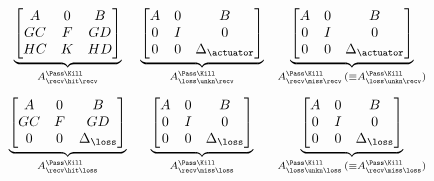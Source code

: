 \begin{equation}
    \label{eq:pass-kill} 
    \begin{matrix}
        \underbrace{\begin{bmatrix}
            A  & 0  & B \\
            GC & F & GD \\
            HC & K & HD \\
        \end{bmatrix}}_{A_{\recv\hit\recv}^{\Pass\Kill}} & 
        \underbrace{\begin{bmatrix}
            A & 0 & B \\
            0 & I & 0 \\
            0 & 0 & \Delta_\actuator \\
        \end{bmatrix}}_{A_{\loss\unkn\recv}^{\Pass\Kill}} &
        \underbrace{\begin{bmatrix}
            A & 0 & B \\
            0 & I & 0 \\
            0 & 0 & \Delta_\actuator \\
        \end{bmatrix}}_{A_{\recv\miss\recv}^{\Pass\Kill}\, (\equiv A_{\loss\unkn\recv}^{\Pass\Kill})} \\[4em]
        \underbrace{\begin{bmatrix}
            A  & 0 & B \\
            GC & F & GD \\
            0  & 0 & \Delta_\loss \\
        \end{bmatrix}}_{A_{\recv\hit\loss}^{\Pass\Kill}} & 
         \underbrace{\begin{bmatrix}
            A & 0 & B \\
            0 & I & 0 \\
            0 & 0 & \Delta_\loss \\
         \end{bmatrix}}_{A_{\recv\miss\loss}^{\Pass\Kill}} & 
        \underbrace{\begin{bmatrix}
            A & 0 & B \\
            0 & I & 0 \\
            0 & 0 & \Delta_\loss \\
        \end{bmatrix}}_{A_{\loss\unkn\loss}^{\Pass\Kill}\, (\equiv A_{\recv\miss\loss}^{\Pass\Kill})}
    \end{matrix}
\end{equation}%
